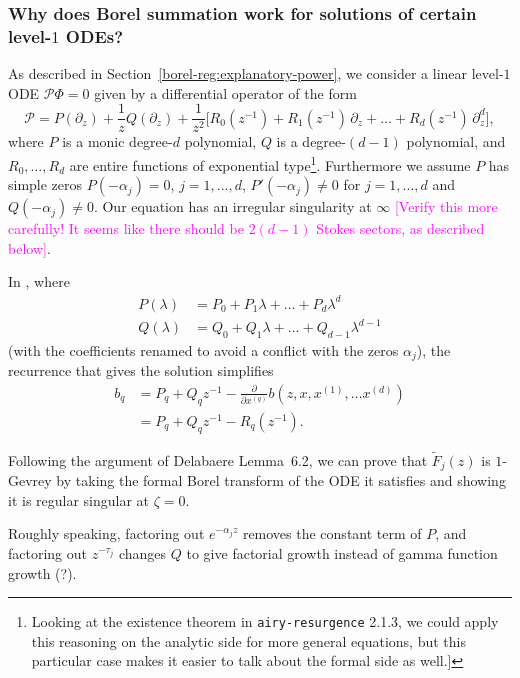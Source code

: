 \documentclass{article}
\theoremstyle{definition}
\newcommand{\series}[1]{\tilde{#1}}
\begin{document}
\subsubsection{Why does Borel summation work for solutions of certain level-$1$ ODEs?}
As described in Section~\ref{borel-reg:explanatory-power}, we consider a linear level-$1$ ODE $\mathcal{P}\Phi = 0$ given by a differential operator of the form
\begin{equation}\label{eqn:standard ODE}
\mathcal{P} = P(\partial_z) + \frac{1}{z} Q(\partial_z) + \frac{1}{z^2}\big[ R_0(z^{-1}) + R_1(z^{-1})\,\partial_z + \ldots + R_d(z^{-1})\,\partial_z^d \big],
\end{equation}
where $P$ is a monic degree-$d$ polynomial, $Q$ is a degree-$(d-1)$ polynomial, and $R_0, \ldots, R_d$ are entire functions of exponential type\footnote{Looking at the existence theorem in {\tt airy-resurgence} 2.1.3, we could apply this reasoning on the analytic side for more general equations, but this particular case makes it easier to talk about the formal side as well.]}. Furthermore we assume $P$ has simple zeros $P(-\alpha_j)=0$, $j=1,...,d$, $P'(-\alpha_j)\neq 0$ for $j=1,...,d$ and $Q(-\alpha_j)\neq 0$. Our equation has an irregular singularity at $\infty$ \textcolor{magenta}{[Verify this more carefully! It seems like there should be $2(d-1)$ Stokes sectors, as described below]}.

\color{DarkTurquoise}
In \cite[Proposition~2.2.7]{EcalleIII}, where
\begin{align*}
P(\lambda) & = P_0 + P_1 \lambda + \ldots + P_d \lambda^d \\
Q(\lambda) & = Q_0 + Q_1 \lambda + \ldots + Q_{d-1} \lambda^{d-1}
\end{align*}
(with the coefficients renamed to avoid a conflict with the zeros $\alpha_j$), the recurrence that gives the solution simplifies
\begin{align*} b_q & = P_q + Q_q z^{-1} - \frac{\partial}{\partial x^{(q)}} b(z, x, x^{(1)}, \ldots x^{(d)}) \\
& = P_q + Q_q z^{-1} - R_q(z^{-1}).
\end{align*}

Following the argument of Delabaere Lemma~6.2, we can prove that $\series{F}_j(z)$ is $1$-Gevrey by taking the formal Borel transform of the ODE it satisfies and showing it is regular singular at $\zeta=0$. 

Roughly speaking, factoring out $e^{-\alpha_j z}$ removes the constant term of $P$, and factoring out $z^{-\tau_j}$ changes $Q$ to give factorial growth instead of gamma function growth (?).
\end{document}

